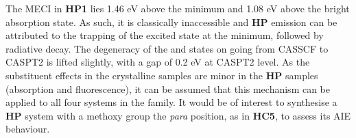 The MECI in \textbf{HP1} lies 1.46 eV above the \Kstar{} minimum and 1.08 eV above the bright absorption state. As such, it is classically inaccessible and \textbf{HP} emission can be attributed to the trapping of the excited state at the \Kstar{} minimum, followed by radiative decay. The degeneracy of the \sone{} and \szero{} states on going from CASSCF to CASPT2 is lifted slightly, with a gap of 0.2 eV at CASPT2 level. As the substituent effects in the crystalline samples are minor in the \textbf{HP} samples (absorption and fluorescence), it can be assumed that this mechanism can be applied to all four systems in the family. It would be of interest to synthesise a \textbf{HP} system with a methoxy group the \textit{para} position, as in \textbf{HC5}, to assess its AIE behaviour.

